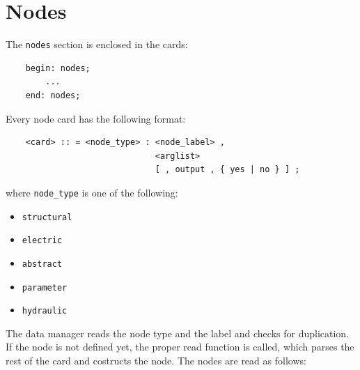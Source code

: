 \documentclass[10pt,dvips]{report}
\begin{document}
\chapter{Nodes}
The {\tt nodes} section is enclosed in the cards:
\begin{verbatim}
    begin: nodes;
        ...
    end: nodes;
\end{verbatim}
Every node card has the following format:
\begin{verbatim}
    <card> :: = <node_type> : <node_label> ,
                              <arglist>
                              [ , output , { yes | no } ] ;
\end{verbatim}
where {\tt node\_type} is one of the following:
\begin{itemize}
    \item {\tt structural}
    \item {\tt electric}
    \item {\tt abstract}
    \item {\tt parameter}
    \item {\tt hydraulic}
\end{itemize}
The data manager reads the node type and the label and checks for
duplication. If the node is not defined yet, the proper read function is
called, which parses the rest of the card and costructs the node.
The nodes are read as follows:
\end{document}
